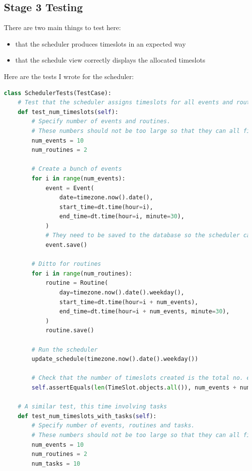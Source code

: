 \documentclass{article}
\begin{document}
\subsection{Stage 3 Testing}
There are two main things to test here:
\begin{samepage}
	\begin{itemize}
		\item that the scheduler produces timeslots in an expected way
		\item that the schedule view correctly displays the allocated timeslots
	\end{itemize}
\end{samepage}

Here are the tests I wrote for the scheduler:
\begin{lstlisting}[language=Python]
class SchedulerTests(TestCase):
    # Test that the scheduler assigns timeslots for all events and routines on a day
    def test_num_timeslots(self):
        # Specify number of events and routines.
        # These numbers should not be too large so that they can all fit in the one day.
        num_events = 10
        num_routines = 2

        # Create a bunch of events
        for i in range(num_events):
            event = Event(
                date=timezone.now().date(),
                start_time=dt.time(hour=i),
                end_time=dt.time(hour=i, minute=30),
            )
            # They need to be saved to the database so the scheduler can see them
            event.save()

        # Ditto for routines
        for i in range(num_routines):
            routine = Routine(
                day=timezone.now().date().weekday(),
                start_time=dt.time(hour=i + num_events),
                end_time=dt.time(hour=i + num_events, minute=30),
            )
            routine.save()

        # Run the scheduler
        update_schedule(timezone.now().date().weekday())

        # Check that the number of timeslots created is the total no. events and routines
        self.assertEquals(len(TimeSlot.objects.all()), num_events + num_routines)

    # A similar test, this time involving tasks
    def test_num_timeslots_with_tasks(self):
        # Specify number of events, routines and tasks.
        # These numbers should not be too large so that they can all fit in the one day.
        num_events = 10
        num_routines = 2
        num_tasks = 10


\end{lstlisting}
\end{document}
